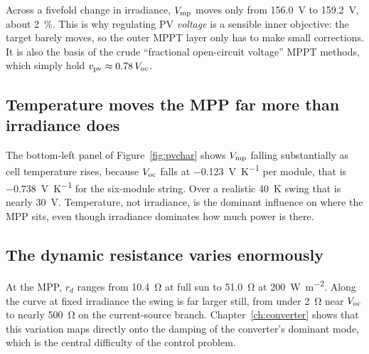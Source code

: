Across a fivefold change in irradiance, $V_{\mathrm{mp}}$ moves only from
\SI{156.0}{\volt} to \SI{159.2}{\volt}, about \SI{2}{\percent}. This is why
regulating PV \emph{voltage} is a sensible inner objective: the target barely
moves, so the outer MPPT layer only has to make small corrections. It is also
the basis of the crude ``fractional open-circuit voltage'' MPPT methods, which
simply hold $v_{\mathrm{pv}} \approx 0.78\,V_{\mathrm{oc}}$.

\subsection{Temperature moves the MPP far more than irradiance does}

The bottom-left panel of Figure~\ref{fig:pvchar} shows $V_{\mathrm{mp}}$ falling
substantially as cell temperature rises, because $V_{\mathrm{oc}}$ falls at
\SI{-0.123}{\volt\per\kelvin} per module, that is \SI{-0.738}{\volt\per\kelvin}
for the six-module string. Over a realistic \SI{40}{\kelvin} swing that is
nearly \SI{30}{\volt}. Temperature, not irradiance, is the dominant influence on
where the MPP sits, even though irradiance dominates how much power is there.

\subsection{The dynamic resistance varies enormously}

At the MPP, $r_d$ ranges from \SI{10.4}{\ohm} at full sun to \SI{51.0}{\ohm} at
\SI{200}{\watt\per\square\metre}. Along the curve at fixed irradiance the swing
is far larger still, from under \SI{2}{\ohm} near $V_{\mathrm{oc}}$ to nearly
\SI{500}{\ohm} on the current-source branch. Chapter~\ref{ch:converter} shows
that this variation maps directly onto the damping of the converter's dominant
mode, which is the central difficulty of the control problem.
